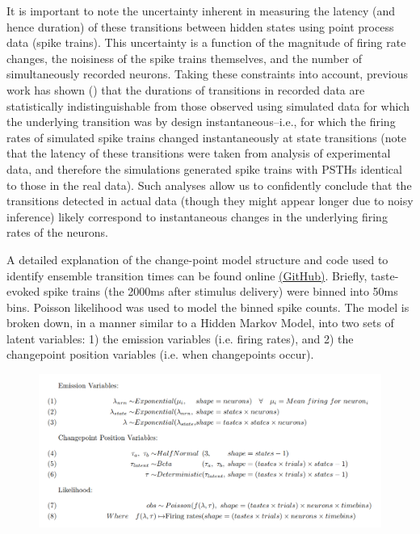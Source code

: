 \begin{refsection}
It is important to note the uncertainty inherent in measuring the latency (and hence duration) of these transitions between hidden states using point process data (spike trains). This uncertainty is a function of the magnitude of firing rate changes, the noisiness of the spike trains themselves, and the number of simultaneously recorded neurons. Taking these constraints into account, previous work has shown (\cite{sadacca2016a}) that the durations of transitions in recorded data are statistically indistinguishable from those observed using simulated data for which the underlying transition was by design instantaneous–i.e., for which the firing rates of simulated spike trains changed instantaneously at state transitions (note that the latency of these transitions were taken from analysis of experimental data, and therefore the simulations generated spike trains with PSTHs identical to those in the real data). Such analyses allow us to confidently conclude that the transitions detected in actual data (though they might appear longer due to noisy inference) likely correspond to instantaneous changes in the underlying firing rates of the neurons.

A detailed explanation of the change-point model structure and code used to identify ensemble transition times can be found online \href{https://github.com/abuzarmahmood/pytau/blob/development/pytau/examples/Bayesian_Changepoint_Model.ipynb}{(GitHub)}. Briefly, taste-evoked spike trains (the 2000ms after stimulus delivery) were binned into 50ms bins. Poisson likelihood was used to model the binned spike counts. The model is broken down, in a manner similar to a Hidden Markov Model, into two sets of latent variables: 1) the emission variables (i.e. firing rates), and 2) the changepoint position variables (i.e. when changepoints occur). 

\begin{figure}
\includegraphics[width=\linewidth]{mahmood_22_figures/mahmood_changepoint_equations.png}
\end{figure}


\end{refsection}
